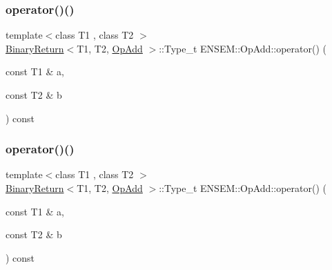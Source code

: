 \subsubsection{\texorpdfstring{operator()()}{operator()()}\hspace{0.1cm}{\footnotesize\ttfamily [1/3]}}
{\footnotesize\ttfamily template$<$class T1 , class T2 $>$ \\
\mbox{\hyperlink{structENSEM_1_1BinaryReturn}{Binary\+Return}}$<$T1, T2, \mbox{\hyperlink{structENSEM_1_1OpAdd}{Op\+Add}} $>$\+::Type\+\_\+t E\+N\+S\+E\+M\+::\+Op\+Add\+::operator() (\begin{DoxyParamCaption}\item[{const T1 \&}]{a,  }\item[{const T2 \&}]{b }\end{DoxyParamCaption}) const\hspace{0.3cm}{\ttfamily [inline]}}

\mbox{\label{structENSEM_1_1OpAdd_a5929c83274ec805686f85b4e65bd70c6}} 
\subsubsection{\texorpdfstring{operator()()}{operator()()}\hspace{0.1cm}{\footnotesize\ttfamily [2/3]}}
{\footnotesize\ttfamily template$<$class T1 , class T2 $>$ \\
\mbox{\hyperlink{structENSEM_1_1BinaryReturn}{Binary\+Return}}$<$T1, T2, \mbox{\hyperlink{structENSEM_1_1OpAdd}{Op\+Add}} $>$\+::Type\+\_\+t E\+N\+S\+E\+M\+::\+Op\+Add\+::operator() (\begin{DoxyParamCaption}\item[{const T1 \&}]{a,  }\item[{const T2 \&}]{b }\end{DoxyParamCaption}) const\hspace{0.3cm}{\ttfamily [inline]}}

\mbox{\label{structENSEM_1_1OpAdd_a5929c83274ec805686f85b4e65bd70c6}} 
